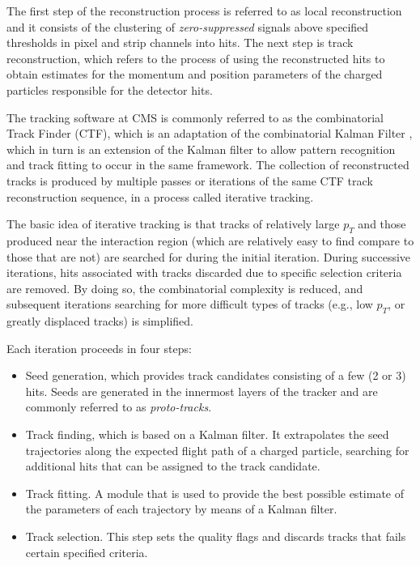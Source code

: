 The first step of the reconstruction process is referred to as local reconstruction and it consists of the clustering of \textit{zero-suppressed} signals above specified thresholds in pixel and strip channels into hits. The next step is track reconstruction, which refers to the process of using the reconstructed hits to obtain estimates for the momentum and position parameters of the charged particles responsible for the detector hits. 

The tracking software at CMS\cite{TRK-11-001} is commonly referred to as the combinatorial Track Finder (CTF), which is an adaptation of the combinatorial Kalman Filter \cite{Billoir:1989mh,BILLOIR1990219,Mankel:1997dy}, which in turn is an extension of the Kalman filter\cite{Fruhwirth:1987fm} to allow pattern recognition and track fitting to occur in the same framework. The collection of reconstructed tracks is produced by multiple passes or iterations of the same CTF track reconstruction sequence, in a process called iterative tracking. 

The basic idea of iterative tracking is that tracks of relatively large $p_{T}$ and those produced near the interaction region (which are relatively easy to find compare to those that are not) are searched for during the initial iteration. During successive iterations, hits associated with tracks discarded due to specific selection criteria are removed. By doing so, the combinatorial complexity is reduced, and subsequent iterations searching for more difficult types of tracks (e.g., low $p_{T}$, or greatly displaced tracks) is simplified.

Each iteration proceeds in four steps:

\begin{itemize}
	\item Seed generation, which provides track candidates consisting of a few (2 or 3) hits. Seeds are generated in the innermost layers of the tracker and are commonly referred to as \textit{proto-tracks}.
	\item Track finding, which is based on a Kalman filter. It extrapolates the seed trajectories along the expected flight path of a charged particle, searching for additional hits that can be assigned to the track candidate.
	\item Track fitting. A module that is used to provide the best possible estimate of the parameters of each trajectory by means of a Kalman filter.
	\item Track selection. This step sets the quality flags and discards tracks that fails certain specified criteria.
\end{itemize}

